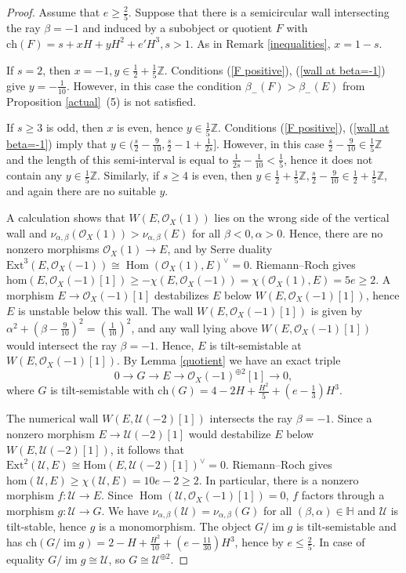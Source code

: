 \documentclass{amsart}
\DeclareMathOperator{\Hom}{Hom}
\DeclareMathOperator{\im}{im}
\begin{document}
	\begin{proof}Assume that $e\ge\frac 25$. Suppose that there is a semicircular wall intersecting the ray $\beta=-1$ and induced by a subobject or quotient $F$ with $\mathrm{ch}(F)=s+xH+yH^2+e'H^3, s>1$. As in Remark \ref{inequalities}, $x=1-s$.
		
		If $s=2$, then $x=-1,y\in\frac 12+\frac 15\mathbb Z$. Conditions (\ref{F positive}), (\ref{wall at beta=-1}) give $y=-\frac{1}{10}$. However, in this case the condition $\beta_-(F)>\beta_-(E)$ from Proposition \ref{actual}~(5) is not satisfied.
		
		If $s\ge 3$ is odd, then $x$ is even, hence $y\in\frac 15\mathbb Z$. Conditions (\ref{F positive}), (\ref{wall at beta=-1}) imply that $y\in(\frac s2-\frac{9}{10},\frac s2-1+\frac{1}{2s}]$. However, in this case $\frac s2-\frac{9}{10}\in\frac 15\mathbb Z$ and the length of this semi-interval is equal to $\frac{1}{2s}-\frac{1}{10}<\frac 15$, hence it does not contain any $y\in\frac 15\mathbb Z$. Similarly, if $s\ge 4$ is even, then $y\in\frac 12+\frac 15\mathbb Z,\frac s2-\frac{9}{10}\in\frac 12+\frac 15\mathbb Z$, and again there are no suitable $y$.
		
		A calculation shows that $W(E,\mathcal O_X(1))$ lies on the wrong side of the vertical wall and $\nu_{\alpha,\beta}(\mathcal O_X(1))>\nu_{\alpha,\beta}(E)$ for all $\beta<0,\alpha>0$. Hence, there are no nonzero morphisms $\mathcal O_X(1)\to E$, and by Serre duality $\mathrm{Ext}^3(E,\mathcal O_X(-1))\cong\Hom(\mathcal O_X(1),E)^\vee=0$. Riemann--Roch gives $\mathrm{hom}(E,\mathcal O_X(-1)[1])\ge -\chi(E,\mathcal O_X(-1))=\chi(\mathcal O_X(1),E)=5e\ge 2$. A morphism $E\to\mathcal O_X(-1)[1]$ destabilizes $E$ below $W(E,\mathcal O_X(-1)[1])$, hence $E$ is unstable below this wall. The wall $W(E,\mathcal O_X(-1)[1])$ is given by $\alpha^2+(\beta-\frac{9}{10})^2=(\frac{1}{10})^2$, and any wall lying above $W(E,\mathcal O_X(-1)[1])$ would intersect the ray $\beta=-1$. Hence, $E$ is tilt-semistable at $W(E,\mathcal O_X(-1)[1])$. By Lemma \ref{quotient} we have an exact triple
		$$0\to G\to E\to\mathcal O_X(-1)^{\oplus 2}[1]\to 0,$$
		where $G$ is tilt-semistable with $\mathrm{ch}(G)=4-2H+\frac{H^2}{5}+(e-\frac 13)H^3$. 
		
		The numerical wall $W(E,\mathcal U(-2)[1])$ intersects the ray $\beta=-1$. Since a nonzero morphism $E\to\mathcal U(-2)[1]$ would destabilize $E$ below $W(E,\mathcal U(-2)[1])$, it follows that $\mathrm{Ext}^2(\mathcal U,E)\cong\mathrm{Hom}(E,\mathcal U(-2)[1])^\vee=0$. Riemann--Roch gives $\mathrm{hom}(\mathcal U,E)\ge\chi(\mathcal U,E)=10e-2\ge 2$. In particular, there is a nonzero morphism $f:\mathcal U\to E$. Since $\Hom(\mathcal U,\mathcal O_X(-1)[1])=0$, $f$ factors through a morphism $g:\mathcal U\to G$. We have $\nu_{\alpha, \beta}(\mathcal U)=\nu_{\alpha, \beta}(G)$ for all $(\beta,\alpha)\in\mathbb H$ and $\mathcal U$ is tilt-stable, hence $g$ is a monomorphism. The object $G/\im g$ is tilt-semistable and has $\mathrm{ch}(G/\im g)=2-H+\frac{H^2}{10}+(e-\frac{11}{30})H^3$, hence by \cite[Lemma 3.6]{Vass} $e\le\frac 25$. In case of equality $G/\im g\cong\mathcal U$, so $G\cong\mathcal U^{\oplus 2}$.
	\end{proof}
	
\end{document}
